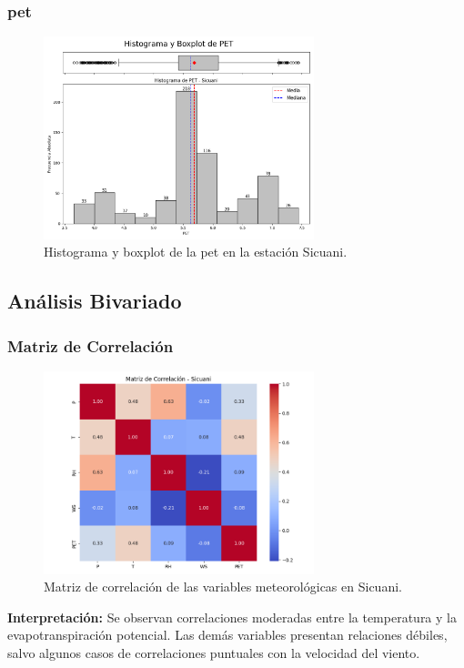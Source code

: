 \subsubsection*{\gls{pet} }
\begin{figure}[htbp]
\centering
\includegraphics[width=0.7\textwidth]{resultados/por_estacion_meteorologica/Sicuani/PET_histograma.png}
\caption{Histograma y boxplot de la \gls{pet}  en la estación Sicuani.}
\label{fig:sicuani_PET}
\end{figure}

\subsection{Análisis Bivariado}

\subsubsection*{Matriz de Correlación}
\begin{figure}[htbp]
\centering
\includegraphics[width=0.7\textwidth]{resultados/por_estacion_meteorologica/Sicuani/matriz_correlacion.png}
\caption{Matriz de correlación de las variables meteorológicas en Sicuani.}
\label{fig:sicuani_corr}
\end{figure}
\textbf{Interpretación:} Se observan correlaciones moderadas entre la temperatura y la evapotranspiración potencial. Las demás variables presentan relaciones débiles, salvo algunos casos de correlaciones puntuales con la velocidad del viento.

